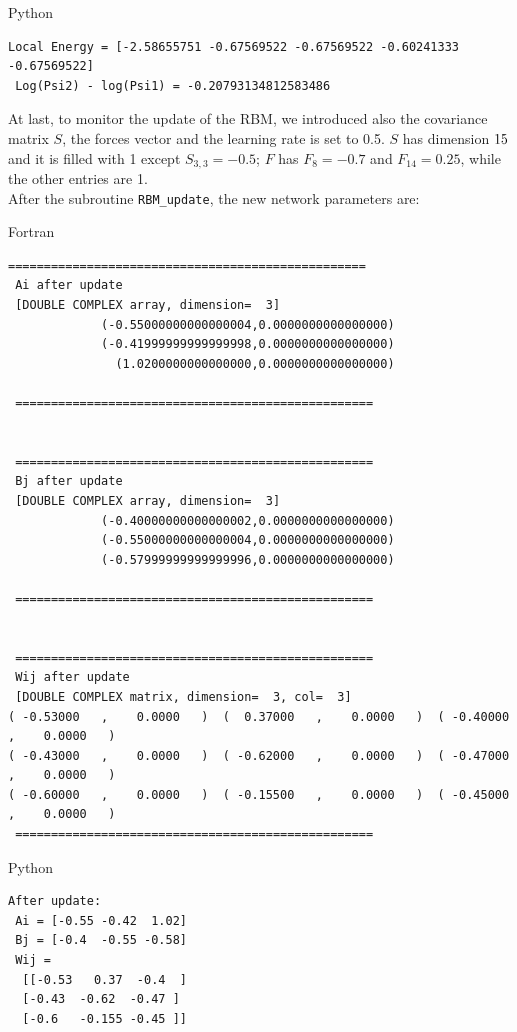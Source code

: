 \documentclass[a4paper,11pt]{article}
\begin{document}
\begin{description}
    \item[Python]
\end{description}
\begin{lstlisting}[numbers=none]
 Local Energy = [-2.58655751 -0.67569522 -0.67569522 -0.60241333 -0.67569522]
 Log(Psi2) - log(Psi1) = -0.20793134812583486
\end{lstlisting}

At last, to monitor the update of the RBM, we introduced also the covariance matrix $S$, the forces vector and the learning rate is set to 0.5. $S$ has dimension $15 \time 15$ and it is filled with 1 except $S_{3,3} = -0.5$; $F$ has $F_8 = -0.7$ and $F_{14} = 0.25$, while the other entries are 1. \\
After the subroutine \texttt{RBM\_update}, the new network parameters are:
\begin{description}
    \item[Fortran]
\end{description}
\begin{lstlisting}[numbers=none]
 ==================================================
 Ai after update
 [DOUBLE COMPLEX array, dimension=  3]
             (-0.55000000000000004,0.0000000000000000)
             (-0.41999999999999998,0.0000000000000000)
               (1.0200000000000000,0.0000000000000000)

 ==================================================


 ==================================================
 Bj after update
 [DOUBLE COMPLEX array, dimension=  3]
             (-0.40000000000000002,0.0000000000000000)
             (-0.55000000000000004,0.0000000000000000)
             (-0.57999999999999996,0.0000000000000000)

 ==================================================


 ==================================================
 Wij after update
 [DOUBLE COMPLEX matrix, dimension=  3, col=  3]
( -0.53000   ,    0.0000   )  (  0.37000   ,    0.0000   )  ( -0.40000   ,    0.0000   )
( -0.43000   ,    0.0000   )  ( -0.62000   ,    0.0000   )  ( -0.47000   ,    0.0000   )
( -0.60000   ,    0.0000   )  ( -0.15500   ,    0.0000   )  ( -0.45000   ,    0.0000   )
 ==================================================
\end{lstlisting}

\begin{description}
    \item[Python]
\end{description}
\begin{lstlisting}[numbers=none]
 After update:
 Ai = [-0.55 -0.42  1.02]
 Bj = [-0.4  -0.55 -0.58]
 Wij =
  [[-0.53   0.37  -0.4  ]
  [-0.43  -0.62  -0.47 ]
  [-0.6   -0.155 -0.45 ]]
\end{lstlisting}
\end{document}

